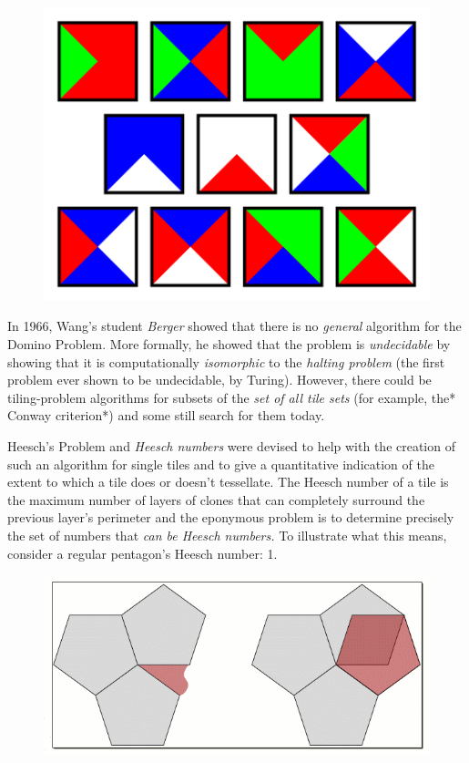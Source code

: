 \begin{figure}[htbp]
\centering
\includegraphics{image_7.png}
\caption{}
\end{figure}

In 1966, Wang's student \emph{Berger }showed that there is no
\emph{general }algorithm for the Domino Problem. More formally, he
showed that the problem is \emph{undecidable} by showing that it is
computationally \emph{isomorphic }to the \emph{halting problem }(the
first problem ever shown to be undecidable, by Turing). However, there
could be tiling-problem algorithms for subsets of the \emph{set of all
tile sets }(for example, the* Conway criterion*) and some still search
for them today.

Heesch's Problem and \emph{Heesch numbers }were devised to help with the
creation of such an algorithm for single tiles and to give a
quantitative indication of the extent to which a tile does or doesn't
tessellate. The Heesch number of a tile is the maximum number of layers
of clones that can completely surround the previous layer's perimeter
and the eponymous problem is to determine precisely the set of numbers
that \emph{can be Heesch numbers. }To illustrate what this means,
consider a regular pentagon's Heesch number: 1.

\begin{figure}[htbp]
\centering
\includegraphics{image_8.gif}
\caption{}
\end{figure}

